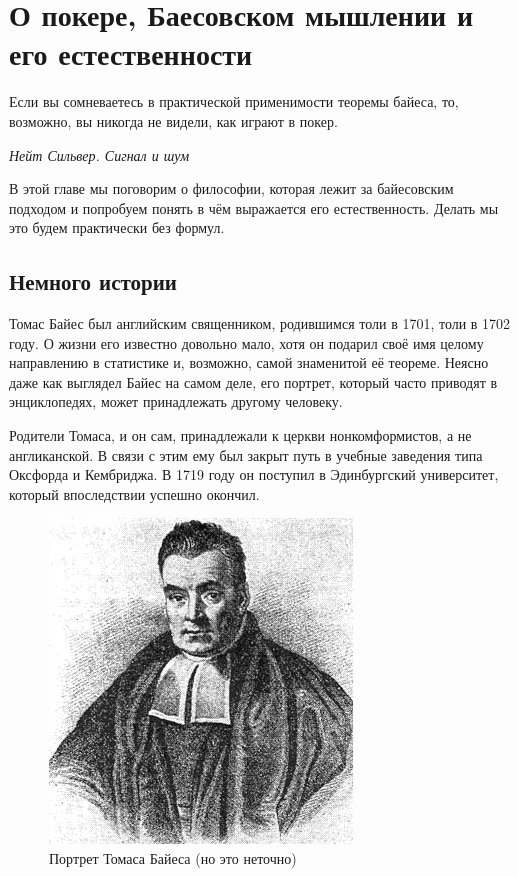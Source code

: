 \documentclass[12pt, a4paper, oneside]{extreport}
\theoremstyle{plain}              %
\theoremstyle{definition}         %
\begin{document}
\chapter[О естественности байесовского мышления]{О покере, Баесовском мышлении и его естественности}


\epigraph{Если вы сомневаетесь в практической применимости теоремы байеса, то, возможно, вы никогда не видели, как играют в покер.}{\textit{Нейт Сильвер. Сигнал и шум }}

В этой главе мы поговорим о философии, которая лежит за байесовским подходом и попробуем понять в чём выражается его естественность. Делать мы это будем практически без формул. 


\section{Немного истории} 

Томас Байес был английским священником, родившимся толи в 1701, толи в 1702 году. О жизни его известно довольно мало, хотя он подарил своё имя целому направлению в статистике и, возможно, самой знаменитой её теореме.  Неясно даже как выглядел Байес на самом деле, его портрет, который часто приводят в энциклопедях, может принадлежать другому человеку.

Родители Томаса, и он сам,  принадлежали к церкви нонкомформистов, а не англиканской. В связи с этим ему был закрыт путь в учебные заведения типа Оксфорда и Кембриджа. В 1719 году он поступил в Эдинбургский университет, который впоследствии успешно окончил.

\begin{figure}
	\centering \includegraphics[width=0.8\linewidth]{images/bayes.png}
	\caption{Портрет Томаса Байеса (но это неточно)}
\end{figure}
\end{document}
